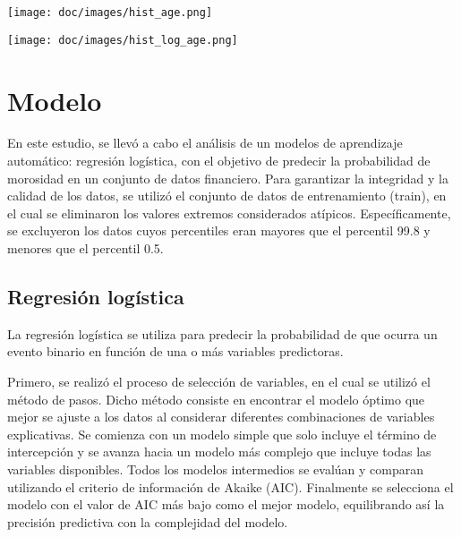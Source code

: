 \documentclass{article}
\begin{document}
\begin{figure*}[h]
    \centering
    \begin{minipage}[t]{0.45\textwidth}
        \centering
        \texttt{[image: doc/images/hist\_age.png]} %
        \caption{Histograma de la variable Age.}
        \label{fig:hist_age}
    \end{minipage}
    \hfill
    \begin{minipage}[t]{0.45\textwidth}
        \centering
        \texttt{[image: doc/images/hist\_log\_age.png]} %
        \caption{Histograma de la variable Age despu\'es de aplicarle el logaritmo.}
        \label{fig:hist_age_2}
    \end{minipage}
    \label{hists}
\end{figure*}


\section{Modelo}

En este estudio, se llev\'o a cabo el análisis de un modelos de aprendizaje automático: regresión logística, con el objetivo de predecir la probabilidad de morosidad en un conjunto de datos financiero. Para garantizar la integridad y la calidad de los datos, se utilizó el conjunto de datos de entrenamiento (train), en el cual se eliminaron los valores extremos considerados atípicos. Específicamente, se excluyeron los datos cuyos percentiles eran mayores que el percentil 99.8 y menores que el percentil 0.5. 


\subsection{Regresi\'on log\'istica}

La regresi\'on log\'istica se utiliza para predecir la probabilidad de que ocurra un evento binario en función de una o más variables predictoras.

Primero, se realiz\'o el proceso de selección de variables, en el cual se utiliz\'o el método de pasos. Dicho m\'etodo consiste en encontrar el modelo óptimo que mejor se ajuste a los datos al considerar diferentes combinaciones de variables explicativas. Se comienza con un modelo simple que solo incluye el término de intercepción y se avanza hacia un modelo más complejo que incluye todas las variables disponibles. Todos los modelos intermedios se evalúan y comparan utilizando el criterio de información de Akaike (AIC). Finalmente se selecciona el modelo con el valor de AIC más bajo como el mejor modelo, equilibrando así la precisión predictiva con la complejidad del modelo.
\end{document}
